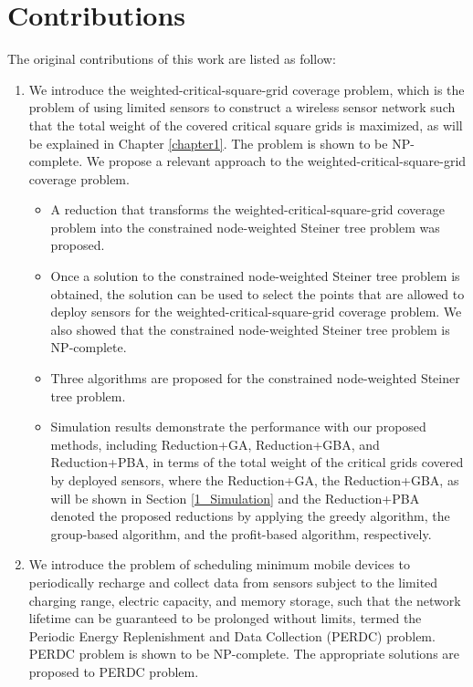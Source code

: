 \section{Contributions}

The original contributions of this work are listed as follow:

\begin{enumerate}

\item We introduce the weighted-critical-square-grid
coverage problem, which is the problem of using limited sensors to
construct a wireless sensor network such that the total weight of
the covered critical square grids is maximized, as will be explained
in Chapter \ref{chapter1}. The problem is shown to be NP-complete.
We propose a relevant approach to the weighted-critical-square-grid
coverage problem.

    \begin{itemize}
      \item  A reduction that transforms
        the weighted-critical-square-grid coverage problem into the
        constrained node-weighted Steiner tree problem was proposed.
      \item Once a solution to the constrained node-weighted Steiner tree problem is
        obtained, the solution can be used to select the points that are
        allowed to deploy sensors for the weighted-critical-square-grid
        coverage problem. We also showed that the constrained node-weighted
        Steiner tree problem is NP-complete.
      \item Three algorithms are proposed for the constrained
        node-weighted Steiner tree problem.
      \item Simulation results demonstrate the performance with our proposed
        methods, including Reduction+GA, Reduction+GBA, and Reduction+PBA, in terms of the total weight of the critical grids covered by
        deployed sensors, where the Reduction+GA, the Reduction+GBA, as will be shown
        in Section \ref{1_Simulation} and the Reduction+PBA denoted the proposed reductions by applying the greedy
        algorithm, the group-based algorithm, and the profit-based
        algorithm, respectively.
    \end{itemize}

\item We introduce the problem of scheduling minimum mobile
devices to periodically recharge and collect data from sensors
subject to the limited charging range, electric capacity, and memory
storage, such that the network lifetime can be guaranteed to be
prolonged without limits, termed the Periodic Energy Replenishment
and Data Collection (PERDC) problem. PERDC problem is shown to be NP-complete.
The appropriate solutions are proposed to PERDC problem.


\end{enumerate}
